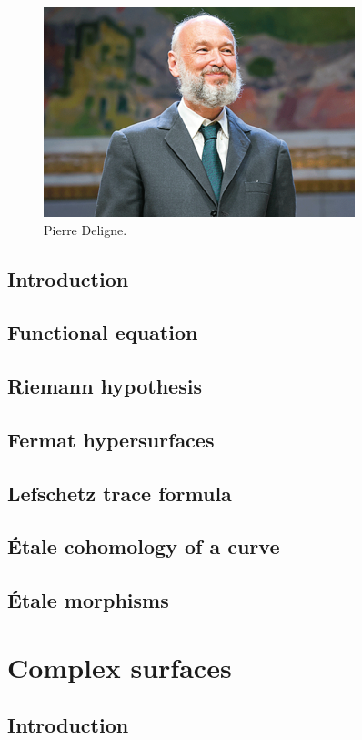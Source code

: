 \documentclass [11 pt, oneside] {article}
\begin{document}
\begin{figure}
	\begin{center}
		\includegraphics[scale=0.8]{images/deligne}
		\caption{Pierre Deligne.}
	\end{center}
\end{figure}

\subsection{Introduction}
\subsection{Functional equation}
\subsection{Riemann hypothesis}
\subsection{Fermat hypersurfaces}
\subsection{Lefschetz trace formula}
\subsection{\'Etale cohomology of a curve}
\subsection{\'Etale morphisms}

\section{Complex surfaces}
\subsection{Introduction}
\end{document}
